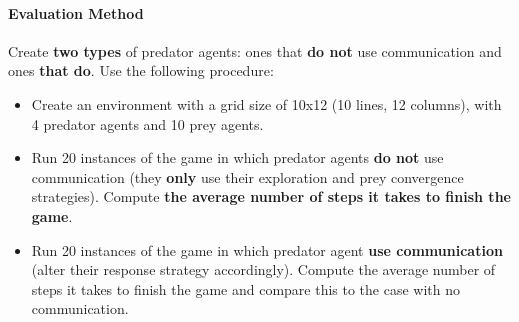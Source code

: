 \documentclass[a4paper, 12pt, twoside]{article}
\begin{document}
\paragraph*{\textbf{Evaluation Method}} Create \textbf{two types} of predator agents: ones that \textbf{do not} use communication and ones \textbf{that do}. Use the following procedure:
\begin{itemize}
	\item Create an environment with a grid size of 10x12 (10 lines, 12 columns), with 4 predator agents and 10 prey agents.
	\item Run 20 instances of the game in which predator agents \textbf{do not} use communication (they \textbf{only} use their exploration and prey convergence strategies). Compute \textbf{the average number of steps it takes to finish the game}.
	\item Run 20 instances of the game in which predator agent \textbf{use communication} (alter their response strategy accordingly). Compute the average number of steps it takes to finish the game and compare this to the case with no communication.
\end{itemize}

\clearpage%

\label{page2}
%
\end{document}
